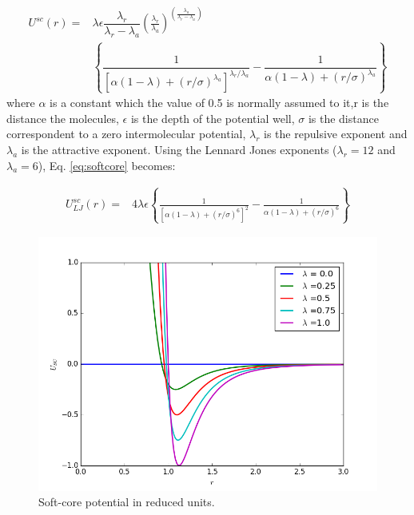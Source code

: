 	\begin{equation}
	\label{eq:softcore}
	\begin{aligned}
	U^{sc}(r) {}=& \lambda\epsilon\dfrac{\lambda_r}{\lambda_r - \lambda_a} \left(\frac{\lambda_r}{\lambda_a} \right)^{\left( \frac{\lambda_a}{\lambda_r - \lambda_a} \right)} \\
	& \left\lbrace\dfrac{1}{\left[\alpha(1-\lambda)+ (r/\sigma)^{\lambda_a}\right]^{\lambda_{r}/\lambda_{a}}} - \dfrac{1}{\alpha(1-\lambda)+(r/\sigma)^{\lambda_a}}\right\rbrace
	\end{aligned}
	\end{equation}
	where $\alpha$ is a constant which the value of 0.5 is normally assumed to it,r is the distance the molecules, $\epsilon$ is the depth of the potential well, $\sigma$ is the distance correspondent to a zero intermolecular potential, $\lambda_r$ is the repulsive exponent and $\lambda_a$ is the attractive exponent. Using the Lennard Jones exponents ($\lambda _{r} =12$ and $\lambda _{a} = 6$), Eq. \eqref{eq:softcore} becomes:
	
	\begin{equation}
	\label{eq:softcoreLJ}
	\begin{aligned}
	U_{LJ}^{sc}(r) {}=& 4\lambda\epsilon \left\lbrace\frac{1}{\left[\alpha(1-\lambda)+ (r/\sigma)^{6}\right]^{2}} - \frac{1}{\alpha(1-\lambda)+(r/\sigma)^{6}}\right\rbrace
	\end{aligned}
	\end{equation}
	
	\begin{figure}[H]
		\centering
		\includegraphics[width=0.9\linewidth]{Figures/SC}
		\caption{Soft-core potential in reduced units.}
		\label{fig:SC}
	\end{figure}
	

